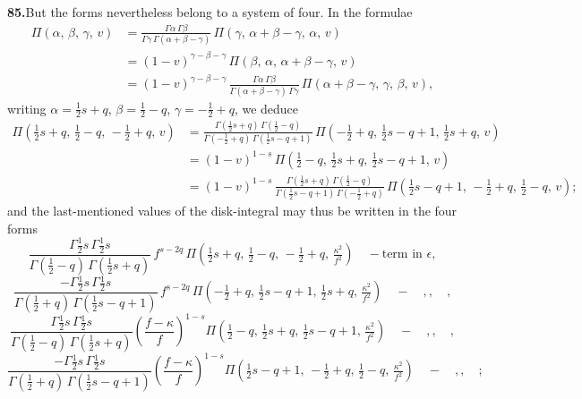 \documentclass[11pt]{article}
\begin{document}
\noindent\textbf{85.}\quad But the forms nevertheless belong to a system of four. In the formulae
\begin{align*}
\Pi(\alpha,\,\beta,\,\gamma,\,v)
&= \frac{\Gamma\alpha\,\Gamma\beta}{\Gamma\gamma\,\Gamma(\alpha+\beta-\gamma)}\,\Pi(\gamma,\,\alpha+\beta-\gamma,\,\alpha,\,v) \\[3pt]
&= (1-v)^{\gamma-\beta-\gamma}\,\Pi(\beta,\,\alpha,\,\alpha+\beta-\gamma,\,v) \\[3pt]
&= (1-v)^{\gamma-\beta-\gamma}\,\frac{\Gamma\alpha\,\Gamma\beta}{\Gamma(\alpha+\beta-\gamma)\,\Gamma\gamma}\,\Pi(\alpha+\beta-\gamma,\,\gamma,\,\beta,\,v),
\end{align*}
writing $\alpha=\tfrac{1}{2}s+q$, $\beta=\tfrac{1}{2}-q$, $\gamma=-\tfrac{1}{2}+q$, we deduce
\begin{align*}
\Pi(\tfrac{1}{2}s+q,\,\tfrac{1}{2}-q,\,-\tfrac{1}{2}+q,\,v)
&= \frac{\Gamma(\tfrac{1}{2}s+q)\,\Gamma(\tfrac{1}{2}-q)}{\Gamma(-\tfrac{1}{2}+q)\,\Gamma(\tfrac{1}{2}s-q+1)}\,\Pi(-\tfrac{1}{2}+q,\,\tfrac{1}{2}s-q+1,\,\tfrac{1}{2}s+q,\,v) \\[3pt]
&= (1-v)^{1-s}\,\Pi(\tfrac{1}{2}-q,\,\tfrac{1}{2}s+q,\,\tfrac{1}{2}s-q+1,\,v) \\[3pt]
&= (1-v)^{1-s}\,\frac{\Gamma(\tfrac{1}{2}s+q)\,\Gamma(\tfrac{1}{2}-q)}{\Gamma(\tfrac{1}{2}s-q+1)\,\Gamma(-\tfrac{1}{2}+q)}\,\Pi(\tfrac{1}{2}s-q+1,\,-\tfrac{1}{2}+q,\,\tfrac{1}{2}-q,\,v);
\end{align*}
and the last-mentioned values of the disk-integral may thus be written in the four forms
\[
\frac{\Gamma\tfrac{1}{2}s\,\Gamma\tfrac{1}{2}s}{\Gamma(\tfrac{1}{2}-q)\,\Gamma(\tfrac{1}{2}s+q)}\,f^{s-2q}\,\Pi(\tfrac{1}{2}s+q,\,\tfrac{1}{2}-q,\,-\tfrac{1}{2}+q,\,\tfrac{\kappa^{2}}{f^{2}}) \quad-\text{term in } \epsilon,
\]
\[
\frac{-\Gamma\tfrac{1}{2}s\,\Gamma\tfrac{1}{2}s}{\Gamma(\tfrac{1}{2}+q)\,\Gamma(\tfrac{1}{2}s-q+1)}\,f^{s-2q}\,\Pi(-\tfrac{1}{2}+q,\,\tfrac{1}{2}s-q+1,\,\tfrac{1}{2}s+q,\,\tfrac{\kappa^{2}}{f^{2}}) \quad-\quad ,, \quad,
\]
\[
\frac{\Gamma\tfrac{1}{2}s\,\Gamma\tfrac{1}{2}s}{\Gamma(\tfrac{1}{2}-q)\,\Gamma(\tfrac{1}{2}s+q)}\!\left(\frac{f-\kappa}{f}\right)^{1-s}\!\Pi(\tfrac{1}{2}-q,\,\tfrac{1}{2}s+q,\,\tfrac{1}{2}s-q+1,\,\tfrac{\kappa^{2}}{f^{2}}) \quad-\quad ,, \quad,
\]
\[
\frac{-\Gamma\tfrac{1}{2}s\,\Gamma\tfrac{1}{2}s}{\Gamma(\tfrac{1}{2}+q)\,\Gamma(\tfrac{1}{2}s-q+1)}\!\left(\frac{f-\kappa}{f}\right)^{1-s}\!\Pi(\tfrac{1}{2}s-q+1,\,-\tfrac{1}{2}+q,\,\tfrac{1}{2}-q,\,\tfrac{\kappa^{2}}{f^{2}}) \quad-\quad ,, \quad;
\]

\bigskip
\end{document}
